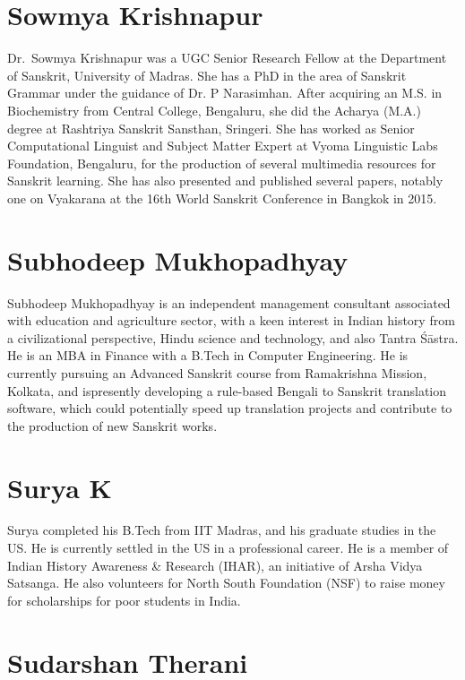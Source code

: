 \section*{Sowmya Krishnapur}

Dr.~Sowmya Krishnapur was a UGC Senior Research Fellow at the Department of Sanskrit, University of Madras. She has a PhD in the area of Sanskrit Grammar under the guidance of Dr. P Narasimhan. After acquiring an M.S. in Biochemistry from Central College, Bengaluru, she did the Acharya (M.A.) degree at Rashtriya Sanskrit Sansthan, Sringeri. She has worked as Senior Computational Linguist and Subject Matter Expert at Vyoma Linguistic Labs Foundation, Bengaluru, for the production of several multimedia resources for Sanskrit learning. She has also presented and published several papers, notably one on Vyakarana at the 16th World Sanskrit Conference in Bangkok in 2015.

\section*{Subhodeep Mukhopadhyay}

Subhodeep Mukhopadhyay is an independent management consultant associated with education and agriculture sector, with a keen interest in Indian history from a civilizational perspective, Hindu science and technology, and also Tantra Śāstra. He is an MBA in Finance with a B.Tech in Computer Engineering. He is currently pursuing an Advanced Sanskrit course from Ramakrishna Mission, Kolkata, and is\break presently developing a rule-based Bengali to Sanskrit translation software, which could potentially speed up translation projects and contribute to the production of new Sanskrit works.

\section*{Surya K}

Surya completed his B.Tech from IIT Madras, and his graduate studies in the US. He is currently settled in the US in a professional career. He is a member of Indian History Awareness \& Research (IHAR), an initiative of Arsha Vidya Satsanga. He also volunteers for North South Foundation (NSF) to raise money for scholarships for poor students in India. 

\section*{Sudarshan Therani}

